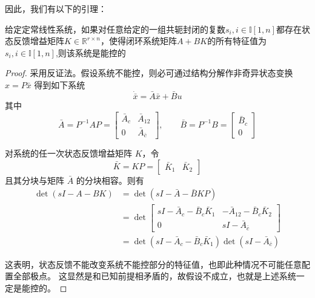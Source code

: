 因此，我们有以下的引理：
\begin{lemma}
    给定定常线性系统，如果对任意给定的一组共轭封闭的复数$s_i,i \in \mathbb{I}[1,n]$都存在状态反馈增益矩阵$K \in \mathbb{R}^{r \times n}$，使得闭环系统矩阵$A+BK$的所有特征值为$s_i,i\in \mathbb{I}[1,n]$,则该系统是能控的
    \begin{proof}
        采用反证法。假设系统不能控，则必可通过结构分解作非奇异状态变换
        $x=P\bar{x}$ 得到如下系统
        \begin{equation*}
            \dot{\bar{x}}=\bar{A}\bar{x}+\bar{B}u
        \end{equation*}
        其中
        \begin{equation*}
            \bar{A}=P^{-1}AP
            =
            \begin{bmatrix}
                \bar{A}_{c} & \bar{A}_{12}\\
                0 & \bar{A}_{\bar{c}}
            \end{bmatrix},
            \qquad
            \bar{B}=P^{-1}B
            =
            \begin{bmatrix}
                \bar{B}_{c}\\
                0
            \end{bmatrix}
        \end{equation*}

        对系统的任一次状态反馈增益矩阵 $K$，令
        \[
            \bar{K}=KP=
            \begin{bmatrix}
                \bar{K}_{1} & \bar{K}_{2}
            \end{bmatrix}
        \]
        且其分块与矩阵 $\bar{A}$ 的分块相容。则有
        \begin{align*}
            \det(sI-A-BK)
            &= \det(sI-\bar{A}-\bar{B}KP)\\
            &= \det
            \begin{bmatrix}
                sI-\bar{A}_{c}-\bar{B}_{c}\bar{K}_{1}
                & -\bar{A}_{12}-\bar{B}_{c}\bar{K}_{2}\\
                0
                & sI-\bar{A}_{\bar{c}}
            \end{bmatrix}\\
            &= \det(sI-\bar{A}_{c}-\bar{B}_{c}\bar{K}_{1})
            \det(sI-\bar{A}_{\bar{c}})
        \end{align*}

        这表明，状态反馈不能改变系统不能控部分的特征值，也即此种情况不可能任意配置全部极点。
        这显然是和已知前提相矛盾的，故假设不成立，也就是上述系统一定是能控的。
    \end{proof}
\end{lemma}


